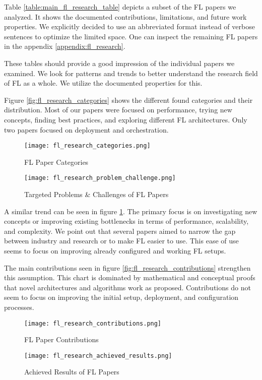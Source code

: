 \begin{figure}[p]
    
\end{figure}

Table \ref{table:main_fl_research_table} depicts a subset of the FL papers we analyzed.
It shows the documented contributions, limitations, and future work properties.
We explicitly decided to use an abbreviated format instead of verbose sentences
to optimize the limited space.
One can inspect the remaining FL papers in the appendix \ref{appendix:fl_research}.

These tables should provide a good impression of the individual papers we examined.
We look for patterns and trends to better understand the research field of FL as a whole.
We utilize the documented properties for this.

Figure \ref{fig:fl_research_categories} shows the different found categories and their distribution.
Most of our papers were focused on performance, trying new concepts, finding best practices,
and exploring different FL architectures.
Only two papers focused on deployment and orchestration.

\begin{figure}[p]
    \centering
    \texttt{[image: fl\_research\_categories.png]}
    \caption{FL Paper Categories}
    \label{fig:fl_research_categories}

    \texttt{[image: fl\_research\_problem\_challenge.png]}
    \caption{Targeted Problems \& Challenges of FL Papers}
    \label{fig:fl_research_problem_challenge}
\end{figure}

A similar trend can be seen in figure \ref{fig:fl_research_problem_challenge}.
The primary focus is on investigating new concepts or improving existing bottlenecks
in terms of performance, scalability, and complexity.
We point out that several papers aimed to narrow the gap between industry and research or
to make FL easier to use.
This ease of use seems to focus on improving already configured and working FL setups.

The main contributions seen in figure \ref{fig:fl_research_contributions} strengthen this assumption.
This chart is dominated by mathematical and conceptual proofs that novel
architectures and algorithms work as proposed.
Contributions do not seem to focus on improving the initial setup, deployment, and configuration processes.

\begin{figure}[p]
    \centering
    \texttt{[image: fl\_research\_contributions.png]}
    \caption{FL Paper Contributions}
    \label{fig:fl_research_contributions}

    \texttt{[image: fl\_research\_achieved\_results.png]}
    \caption{Achieved Results of FL Papers}
    \label{fig:fl_research_achieved_results}
\end{figure}

